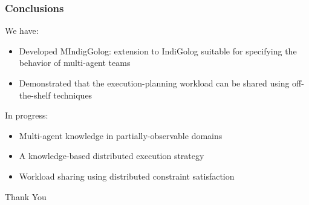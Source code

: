 \documentclass[compress]{beamer}
\begin{document}
\begin{frame}
\frametitle{Conclusions}
We have:
\begin{itemize}
  \item Developed MIndigGolog: extension to IndiGolog suitable for specifying the behavior of multi-agent teams
  \item Demonstrated that the execution-planning workload can be shared using off-the-shelf techniques
\end{itemize}

In progress:
\begin{itemize}
  \item Multi-agent knowledge in partially-observable domains
  \item A knowledge-based distributed execution strategy
  \item Workload sharing using distributed constraint satisfaction
\end{itemize}
\end{frame}

\begin{frame}
\centering \large Thank You\\
\end{frame}
\end{document}
